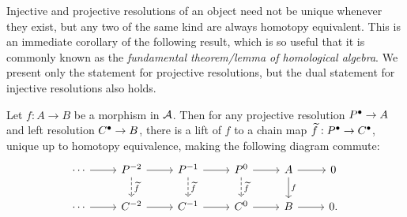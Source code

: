 Injective and projective resolutions of an object need not be unique
whenever they exist, but any two of the same kind are always homotopy
equivalent.
This is an immediate corollary of the following result, which is so
useful that it is commonly known as the \emph{fundamental
theorem/lemma of homological algebra}.
We present only the statement for projective resolutions, but the
dual statement for injective resolutions also holds.

\begin{theorem}
  \label{thm_fund_thm_of_hom_alg}
  Let $f: A \to B$ be a morphism in $\mathcal{A}$.
  Then for any projective resolution ${{P}}^{\bullet} \to A$ and left
  resolution ${{C}}^{\bullet} \to B$, there is a lift of $f$ to a
  chain map $\widetilde{f}: {{P}}^{\bullet} \to {{C}}^{\bullet}$,
  unique up to homotopy equivalence, making the following diagram commute:
  \[
    \begin{tikzcd}
      \cdots & {P^{-2}} & {P^{-1}} & {P^0} & A & 0 \\
      \cdots & {C^{-2}} & {C^{-1}} & {C^0} & B & 0.
      \arrow[from=1-1, to=1-2]
      \arrow[from=1-2, to=1-3]
      \arrow["{\widetilde{f}}", dashed, from=1-2, to=2-2]
      \arrow[from=1-3, to=1-4]
      \arrow["{\widetilde{f}}", dashed, from=1-3, to=2-3]
      \arrow[from=1-4, to=1-5]
      \arrow["{\widetilde{f}}", dashed, from=1-4, to=2-4]
      \arrow[from=1-5, to=1-6]
      \arrow["f", from=1-5, to=2-5]
      \arrow[from=2-1, to=2-2]
      \arrow[from=2-2, to=2-3]
      \arrow[from=2-3, to=2-4]
      \arrow[from=2-4, to=2-5]
      \arrow[from=2-5, to=2-6]
    \end{tikzcd}
  \]


\end{theorem}

